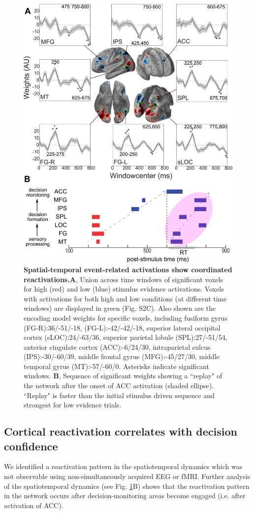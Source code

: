 \begin{figure}[htb!]
\centering
\includegraphics[width=.6\textwidth]{Fig6.png}
\caption{\textbf{Spatial-temporal event-related activations show coordinated reactivations.}\textbf{A}, Union across time windows of significant voxels for high (red) and low (blue) stimulus evidence activations. Voxels with activations for both high and low conditions (at different time windows) are displayed in green (Fig. S2C). Also shown are the encoding model weights for specific voxels, including fusiform gyrus (FG-R):36/-51/-18, (FG-L):-42/-42/-18, superior lateral occipital cortex (sLOC):24/-63/36, superior parietal lobule (SPL):27/-51/54, anterior cingulate cortex (ACC):-6/24/30, intraparietal sulcus (IPS):-30/-60/39, middle frontal gyrus (MFG):-45/27/30, middle temporal gyrus (MT):-57/-60/0. Asterisks indicate significant windows. \textbf{B}, Sequence of significant weights showing a ``replay" of the network after the onset of ACC activation (shaded ellipse). ``Replay" is faster than the initial stimulus driven sequence and strongest for low evidence trials.}
\label{fig:EncodingResults}
\end{figure}

\subsection*{Cortical reactivation correlates with decision confidence}

We identified a reactivation pattern in the spatiotemporal dynamics which was not observable using non-simultaneously acquired EEG or fMRI. Further analysis of the spatiotemporal dynamics (see Fig. \ref{fig:EncodingResults}B) shows that the reactivation pattern in the network occurs after decision-monitoring areas become engaged (i.e. after activation of ACC).

